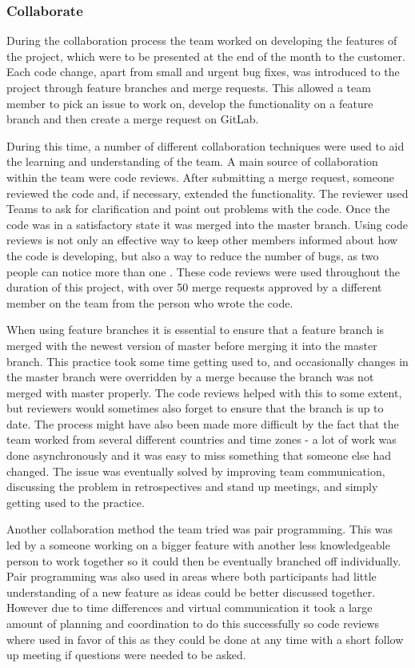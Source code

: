 \documentclass{l3proj}
\begin{document}
\subsubsection{Collaborate}
\label{collab}
During the collaboration process the team worked on developing the features of the project, which were to be presented at the end of the month to the customer. Each code change, apart from small and urgent bug fixes, was introduced to the project through feature branches and merge requests. This allowed a team member to pick an issue to work on, develop the functionality on a feature branch and then create a merge request on GitLab.

During this time, a number of different collaboration techniques were used to aid the learning and understanding of the team. A main source of collaboration within the team were code reviews. After submitting a merge request, someone reviewed the code and, if necessary, extended the functionality. The reviewer used Teams to ask for clarification and point out problems with the code. Once the code was in a satisfactory state it was merged into the master branch. Using code reviews is not only an effective way to keep other members informed about how the code is developing, but also a way to reduce the number of bugs, as two people can notice more than one \cite{Inspections}. These code reviews were used throughout the duration of this project, with over 50 merge requests approved by a different member on the team from the person who wrote the code.

When using feature branches it is essential to ensure that a feature branch is merged with the newest version of master before merging it into the master branch. This practice took some time getting used to, and occasionally changes in the master branch were overridden by a merge because the branch was not merged with master properly. The code reviews helped with this to some extent, but reviewers would sometimes also forget to ensure that the branch is up to date. The process might have also been made more difficult by the fact that the team worked from several different countries and time zones - a lot of work was done asynchronously and it was easy to miss something that someone else had changed. The issue was eventually solved by improving team communication, discussing the problem in retrospectives and stand up meetings, and simply getting used to the practice.

Another collaboration method the team tried was pair programming. This was led by a someone working on a bigger feature with another less knowledgeable person to work together so it could then be eventually branched off individually. Pair programming was also used in areas where both participants had little understanding of a new feature as ideas could be better discussed together. However due to time differences and virtual communication it took a large amount of planning and coordination to do this successfully so code reviews where used in favor of this as they could be done at any time with a short follow up meeting if questions were needed to be asked.
\end{document}
